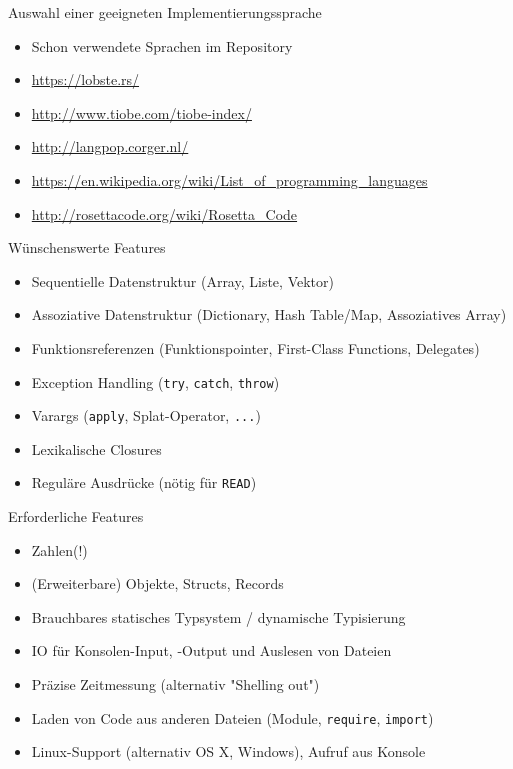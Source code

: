 \documentclass[presentation]{beamer}
\begin{document}
\begin{frame}[label=sec-3-2]{Auswahl einer geeigneten Implementierungssprache}
\begin{itemize}
\item Schon verwendete Sprachen im Repository
\item \url{https://lobste.rs/}
\item \url{http://www.tiobe.com/tiobe-index/}
\item \url{http://langpop.corger.nl/}
\item \url{https://en.wikipedia.org/wiki/List_of_programming_languages}
\item \url{http://rosettacode.org/wiki/Rosetta_Code}
\end{itemize}
\end{frame}

\begin{frame}[fragile,label=sec-3-3]{Wünschenswerte Features}
 \begin{itemize}
\item Sequentielle Datenstruktur (Array, Liste, Vektor)
\item Assoziative Datenstruktur (Dictionary, Hash Table/Map, Assoziatives Array)
\item Funktionsreferenzen (Funktionspointer, First-Class Functions, Delegates)
\item Exception Handling (\texttt{try}, \texttt{catch}, \texttt{throw})
\item Varargs (\texttt{apply}, Splat-Operator, \texttt{...})
\item Lexikalische Closures
\item Reguläre Ausdrücke (nötig für \texttt{READ})
\end{itemize}
\end{frame}

\begin{frame}[fragile,label=sec-3-4]{Erforderliche Features}
 \begin{itemize}
\item Zahlen(!)
\item (Erweiterbare) Objekte, Structs, Records
\item Brauchbares statisches Typsystem / dynamische Typisierung
\item IO für Konsolen-Input, -Output und Auslesen von Dateien
\item Präzise Zeitmessung (alternativ "Shelling out")
\item Laden von Code aus anderen Dateien (Module, \texttt{require}, \texttt{import})
\item Linux-Support (alternativ OS X, Windows), Aufruf aus Konsole
\end{itemize}
\end{frame}
\end{document}
